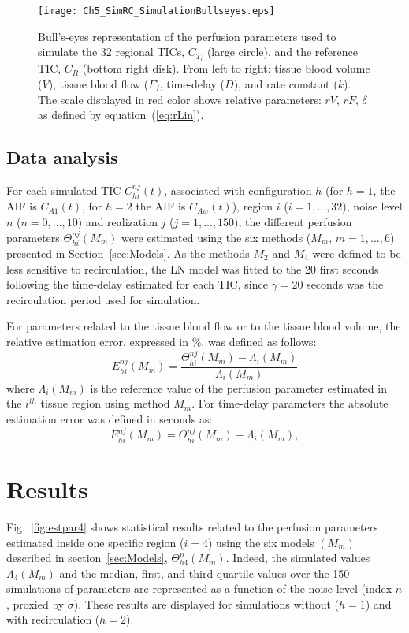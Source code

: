 \begin{figure}
\center
\texttt{[image: Ch5\_SimRC\_SimulationBullseyes.eps]}
\caption{Bull's-eyes representation of the perfusion parameters used to simulate the 32 regional TICs, $C_{T_i}$ (large circle), and the reference TIC, $C_R$ (bottom right disk). From left to right: tissue blood volume ($V$), tissue blood flow ($F$), time-delay ($D$), and rate constant ($k$). The scale displayed in red color shows relative parameters: $rV$, $rF$, $\delta$ as defined by equation~(\ref{eq:rLin}).}
\label{fig:simpar}
\vspace{-3mm}
\end{figure}

\subsection{Data analysis}
\label{sec:datana}

For each simulated TIC $C_{hi}^{nj}(t)$, associated with configuration $h$ (for $h=1$, the AIF is $C_{A1}(t)$, for $h=2$ the AIF is $C_{Aw}(t)$), region $i$ ($i=1,..., 32$), noise level $n$ ($n=0, ...,10$) and realization $j$ ($j=1,...,150$), the different perfusion parameters $\Theta_{hi}^{nj}(M_m)$ were estimated using the six methods ($M_m$, $m=1, ..., 6$) presented in Section~\ref{sec:Models}.
As the methods $M_2$ and $M_4$ were defined to be less sensitive to recirculation, the LN model was fitted to the 20 first seconds following the time-delay estimated for each TIC, since $\gamma = 20$ seconds was the recirculation period used for simulation.

For parameters related to the tissue blood flow or to the tissue blood volume, the relative estimation error, expressed in \%, was defined as follows: 
\begin{equation}
E_{hi}^{nj}(M_m) = \frac{\Theta_{hi}^{nj}(M_m) - \Lambda_{i}(M_m)}{\Lambda_{i}(M_m)}
\end{equation}
where $\Lambda_{i}(M_m)$ is the reference value of the perfusion parameter estimated in the $i^{th}$ tissue region using method $M_m$.
For time-delay parameters the absolute estimation error was defined in seconds as: 
\begin{equation}
E_{hi}^{nj}(M_m) =\Theta_{hi}^{nj}(M_m) - \Lambda_{i}(M_m),
\end{equation}

\section{Results}
Fig.~\ref{fig:estpar4} shows statistical results related to the perfusion parameters estimated inside one specific region ($i=4$) using the six models $(M_m)$ described in section~\ref{sec:Models}, $\Theta_{h4}^{n}(M_m)$.
Indeed, the simulated values $\Lambda_{4}(M_m)$ and the median, first, and third quartile values over the 150 simulations of parameters are represented as a function of the noise level (index $n$, proxied by $\sigma$). These results are displayed for simulations without ($h=1$) and with recirculation ($h=2$).


